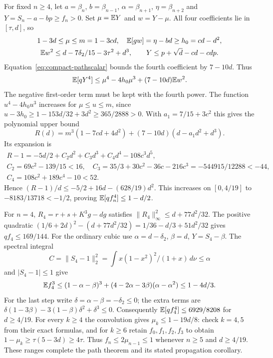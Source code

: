 For fixed $n\ge4$, let $a=\beta_n$, $b=\beta_{n-1}$,
$\alpha=\beta_{n+1}$, $\eta=\beta_{n+2}$ and
$Y=S_n-a-bp\ge f_n>0$. Set $\mu=\mathbb E Y$ and $w=Y-\mu$.
All four coefficients lie in $[\tau,d]$, so
\begin{gather*}
 1-3d\le\mu\le m=1-3cd,\quad
 \mathbb E[gw]=\eta-bd\ge h_0=cd-d^2,\\
 \mathbb E w^2\le d-7\delta_{2}/15-3\tau^2+d^3,\qquad
 Y\le p+\sqrt d-cd-cdp.
\end{gather*}
Equation~\eqref{eq:compact-pathscalar} bounds the fourth coefficient by $7-10d$.
Thus
\[
 \mathbb E[qY^4]\le\mu^4-4h_0\mu^3+(7-10d)\mathbb E w^2.
\]
The negative first-order term must be kept with the fourth power.
The function $u^4-4h_0u^3$ increases for $\mu\le u\le m$, since
$u-3h_0\ge1-153d/32+3d^2\ge365/2888>0$.
With $a_1=7/15+3c^2$ this gives the polynomial upper bound
\[
 R(d)=m^3(1-7cd+4d^2)+(7-10d)(d-a_1d^2+d^3).
\]
Its expansion is
\begin{gather*}
 R-1=-5d/2+C_2d^2+C_3d^3+C_4d^4-108c^3d^5,\\
 C_2=69c^2-139/15<16,\quad
 C_3=35/3+30c^2-36c-216c^3=-544915/12288<-44,\\
 C_4=108c^2+189c^4-10<52.
\end{gather*}
Hence $(R-1)/d\le-5/2+16d-(628/19)d^2$.
This increases on $[0,4/19]$ to $-8183/13718<-1/2$,
proving $\mathbb E[qf_n^4]\le1-d/2$.

For $n=4$, $R_4=r+s+K^3g-dg$ satisfies
$\|R_4\|_\infty^2\le d+77d^2/32$.
The positive quadratic
$(1/6+2d)^2-(d+77d^2/32)=1/36-d/3+51d^2/32$
gives $qf_4\le169/144$.
For the ordinary cubic use $\alpha=d-\delta_{2}$, $\beta=d$, $Y=S_4-\beta$.
The spectral integral
\[
 C=\|S_4-1\|_2^2
 =\int x(1-x^2)^2/(1+x)\,d\nu\le\alpha
\]
and $|S_4-1|\le1$ give
\[
 \mathbb E f_4^3\le(1-\alpha-\beta)^3+(4-2\alpha-3\beta)(\alpha-\alpha^2)
 \le1-4d/3.
\]
For the last step write $\delta=\alpha-\beta=-\delta_{2}\le0$; the extra
terms are $\delta(1-3\beta)-3(1-\beta)\delta^2+\delta^3\le0$.
Consequently $\mathbb E[qf_4^4]\le6929/8208$ for $d\ge4/19$.
For every $k\ge4$ the convolution gives $\mu_k\le1-19d/8$:
check $k=4,5$ from their exact formulas, and for $k\ge6$ retain
$f_0,f_1,f_2,f_3$ to obtain $1-\mu_k\ge\tau(5-3d)\ge4\tau$.
Thus $f_n\le2\mu_{n-1}\le1$ whenever $n\ge5$ and $d\ge4/19$.
These ranges complete the path theorem and its stated propagation corollary.
